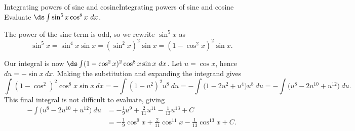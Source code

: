 

\begin{example}{Integrating powers of sine and cosine}{Integrating powers of sine and cosine}\label{Odd Power of Sine}
Evaluate $\ds\int\sin^5x\cos^8x\ dx$.
\end{example}

\begin{solution} 
The power of the sine term is odd, so we rewrite $\sin^5x$ as $$\sin^5x = \sin^4x\sin x = (\sin^2x)^2\sin x = (1-\cos^2x)^2\sin x.$$

Our integral is now $\ds \int (1-\cos^2x)^2\cos^8x\sin x\ dx$. Let $u = \cos x$, hence $du = -\sin x\ dx$. Making the substitution and expanding the integrand gives
$$\int (1-\cos^2)^2\cos^8x\sin x\ dx = -\int (1-u^2)^2u^8\ du = -\int \big(1-2u^2+u^4\big)u^8\ du = -\int \big(u^8-2u^{10}+u^{12}\big)\ du.$$
This final integral is not difficult to evaluate, giving 
\begin{align*} -\int \big(u^8-2u^{10}+u^{12}\big)\ du &= -\frac19u^9 + \frac2{11}u^{11} - \frac1{13}u^{13} + C \\
										&=-\frac19\cos^9 x + \frac2{11}\cos^{11} x - \frac1{13}\cos^{13} x + C.
\end{align*}
\end{solution}






